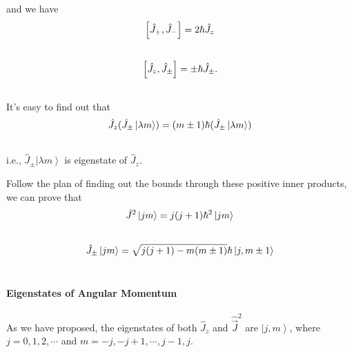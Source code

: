 \documentclass[letterpaper,10pt,english]{sphinxmanual}
\newcommand{\ket}[1]{\left| #1\right\rangle}
\begin{document}
and we have
\begin{gather}
\begin{split}\left[\hat J_+, \hat J_-\right] = 2 \hbar \hat J_z\end{split}\notag\\\begin{split}\end{split}\notag
\end{gather}\begin{gather}
\begin{split}\left[\hat J_z, \hat J_{\pm} \right] = \pm \hbar \hat J_{\pm}.\end{split}\notag\\\begin{split}\end{split}\notag
\end{gather}
It's easy to find out that
\begin{gather}
\begin{split}\hat J_z (\hat J_{\pm}\ket{\lambda m}) = (m\pm 1) \hbar (\hat J_{\pm} \ket{\lambda m})\end{split}\notag\\\begin{split}\end{split}\notag
\end{gather}
i.e., $\hat J_{\pm}\ket{\lambda m}$ is eigenstate of $\hat J_z$.

Follow the plan of finding out the bounds through these positive inner products, we can prove that
\begin{gather}
\begin{split}\hat J^2\ket{jm} = j(j+1)\hbar^2 \ket{jm}\end{split}\notag\\\begin{split}\end{split}\notag
\end{gather}\begin{gather}
\begin{split}\hat J_{\pm}\ket{jm} = \sqrt{j(j+1)-m(m\pm 1)} \hbar \ket{j,m\pm 1}\end{split}\notag\\\begin{split}\end{split}\notag
\end{gather}

\paragraph{Eigenstates of Angular Momentum}
\label{QuantumMechanics2:eigenstates-of-angular-momentum}
As we have proposed, the eigenstates of both $\hat J_z$ and $\hat{\vec J}^2$ are $\ket{j,m}$, where $j=0,1,2,\cdots$ and $m=-j,-j+1,\cdots, j-1,j$.
\end{document}
